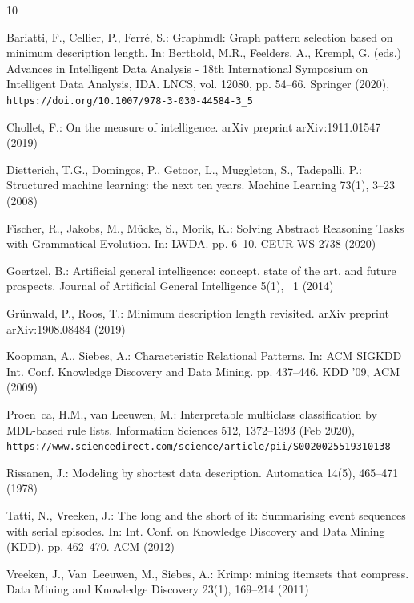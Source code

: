 \documentclass[a4paper]{llncs}
\begin{document}
%
%

\begin{thebibliography}{10}
\providecommand{\url}[1]{\texttt{#1}}
\providecommand{\urlprefix}{URL }

Bariatti, F., Cellier, P., Ferr{\'{e}}, S.: Graphmdl: Graph pattern selection
  based on minimum description length. In: Berthold, M.R., Feelders, A.,
  Krempl, G. (eds.) Advances in Intelligent Data Analysis - 18th International
  Symposium on Intelligent Data Analysis, {IDA}. LNCS, vol. 12080, pp. 54--66.
  Springer (2020), \url{https://doi.org/10.1007/978-3-030-44584-3\_5}

Chollet, F.: On the measure of intelligence. arXiv preprint arXiv:1911.01547
  (2019)

Dietterich, T.G., Domingos, P., Getoor, L., Muggleton, S., Tadepalli, P.:
  Structured machine learning: the next ten years. Machine Learning  73(1),
  3--23 (2008)

Fischer, R., Jakobs, M., M\"{u}cke, S., Morik, K.: Solving {Abstract}
  {Reasoning} {Tasks} with {Grammatical} {Evolution}. In: {LWDA}. pp. 6--10.
  CEUR-WS 2738 (2020)

Goertzel, B.: Artificial general intelligence: concept, state of the art, and
  future prospects. Journal of Artificial General Intelligence  5(1), ~1 (2014)

Gr{\"u}nwald, P., Roos, T.: Minimum description length revisited. arXiv
  preprint arXiv:1908.08484  (2019)

Koopman, A., Siebes, A.: Characteristic {Relational} {Patterns}. In: {ACM}
  {SIGKDD} {Int.} {Conf.} {Knowledge} {Discovery} and {Data} {Mining}. pp.
  437--446. {KDD} '09, ACM (2009)

Proen\, {c}a, H.M., van Leeuwen, M.: Interpretable multiclass classification by
  {MDL}-based rule lists. Information Sciences  512,  1372--1393 (Feb 2020),
  \url{https://www.sciencedirect.com/science/article/pii/S0020025519310138}

Rissanen, J.: Modeling by shortest data description. Automatica  14(5),
  465--471 (1978)

Tatti, N., Vreeken, J.: The long and the short of it: {Summarising} event
  sequences with serial episodes. In: Int. Conf. on Knowledge Discovery and
  Data Mining (KDD). pp. 462--470. ACM (2012)

Vreeken, J., Van~Leeuwen, M., Siebes, A.: Krimp: mining itemsets that compress.
  Data Mining and Knowledge Discovery  23(1),  169--214 (2011)

\end{thebibliography}
\end{document}
